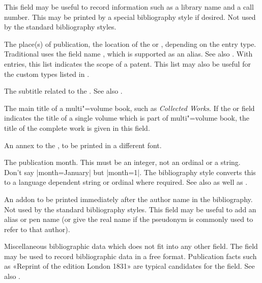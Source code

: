 \documentclass{ltxdockit}[2011/03/25]
\begin{document}
\begin{fieldlist}
This field may be useful to record information such as a library name and a call number. This may be printed by a special bibliography style if desired. Not used by the standard bibliography styles.


The place(s) of publication, \ie the location of the  or , depending on the entry type. Traditional \bibtex uses the field name , which is supported as an alias. See also . With  entries, this list indicates the scope of a patent. This list may also be useful for the custom types listed in .


The subtitle related to the . See also .


The main title of a multi"=volume book, such as \emph{Collected Works}. If the  or  field indicates the title of a single volume which is part of multi"=volume book, the title of the complete work is given in this field.


An annex to the , to be printed in a different font.


The publication month. This must be an integer, not an ordinal or a string. Don't say |month={January}| but |month={1}|. The bibliography style converts this to a language dependent string or ordinal where required. See also  as well as .


An addon to be printed immediately after the author name in the bibliography. Not used by the standard bibliography styles. This field may be useful to add an alias or pen name (or give the real name if the pseudonym is commonly used to refer to that author).


Miscellaneous bibliographic data which does not fit into any other field. The  field may be used to record bibliographic data in a free format. Publication facts such as «Reprint of the edition London 1831» are typical candidates for the  field. See also .


\end{fieldlist}
\end{document}

